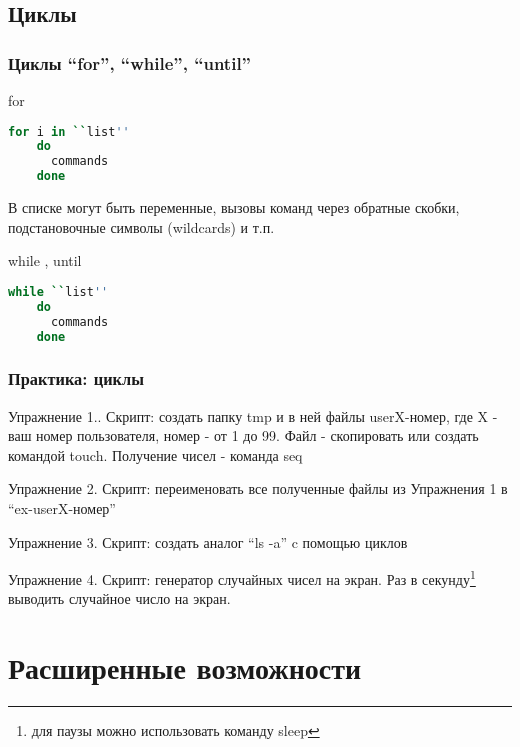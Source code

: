 \subsection{Циклы}

\begin{frame}[fragile]
  \frametitle{Циклы ``for'', ``while'', ``until''}
      \alert{for}
\begin{lstlisting}[language=sh,frame=single,basicstyle=\normalsize,breaklines=true]
	for i in ``list''
	do
	  commands
	done
\end{lstlisting}
      В списке могут быть переменные, вызовы команд через обратные скобки, подстановочные символы (wildcards) и т.п.\pause
  
      \alert{while , until}
\begin{lstlisting}[language=sh,frame=single,basicstyle=\normalsize,breaklines=true]
	while ``list''
	do
	  commands
	done
\end{lstlisting} 
\end{frame}

\begin{frame}
  \frametitle{Практика: циклы}

    \alert{Упражнение 1.}. Скрипт: создать папку tmp и в ней файлы userX-номер, где X - ваш номер пользователя, номер - от 1 до 99. Файл - скопировать или создать командой touch. Получение чисел - команда seq \pause

    \alert{Упражнение 2.} Скрипт: переименовать все полученные файлы из Упражнения 1 в ``ex-userX-номер'' \pause

    \alert{Упражнение 3.} Скрипт: создать аналог ``ls -a'' c помощью циклов \pause

    \alert{Упражнение 4.} Скрипт: генератор случайных чисел на экран. Раз в секунду\footnote{для паузы можно использовать команду sleep} выводить случайное число на экран.
\end{frame}

\section{Расширенные возможности}

